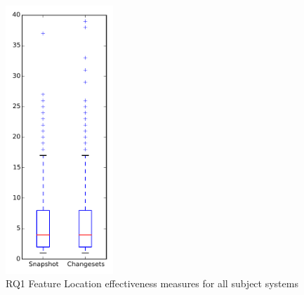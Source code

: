 
\begin{figure}[t]
\centering
\includegraphics[width=0.36\textwidth]{figures/flt/rq1_overview}
\caption{RQ1 Feature Location effectiveness measures for all subject systems}
\label{fig:flt:rq1:overview}
\end{figure}
